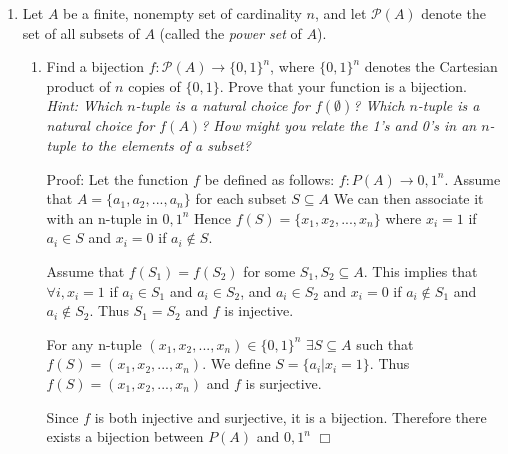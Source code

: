 \documentclass{article}
\newcommand{\bN}{\mathbb{N}}
\newcommand{\sP}{\mathscr{P}}
\begin{document}
{\begin{enumerate}[labelindent=0pt,leftmargin=0pt]
\begin{enumerate}
    Inductive Step: Assume the proposition is true for $k=n$, as in 
    $|A_1\times\cdots\times A_n|=|A_1|\cdots|A_n|$. 
    Consider the sets $A_1, A_2, ..., A_{n+1}$. We can then group the first n-sets and consider their cartesian product as a single set. We will show this set as $B = A_1, A_2, ..., A_n$ 

    By inductive hypothesis we have $|B| = |A_1|... |A_n|$

    Consider the cartesian product $B \times A_{n+1}$ which equals $A_1 \times ... \times A_{n+1}$.

    By (a) we know $|B \times A_{n+1}| = |B|*|A_{n+1}|$.
    Substuiting in $|B|$ we have $|B\times A_{n+1}| = |A_1|...|A_n|*|A_{n+1}|$
    Therefore the statement holds for all $k\in\bN$ 
    $\Box$

    \end{enumerate}
    

    \item Let $A$ be a finite, nonempty set of cardinality $n$, and let $\sP(A)$ denote the set of all subsets of $A$ (called the \textit{power set} of $A$). \begin{enumerate}\item Find a bijection $f:\sP(A)\to\{0,1\}^n$, where $\{0,1\}^n$ denotes the Cartesian product of $n$ copies of $\{0,1\}$. Prove that your function is a bijection. \textit{Hint: Which $n$-tuple is a natural choice for $f(\emptyset)$? Which $n$-tuple is a natural choice for $f(A)$? How might you relate the 1's and 0's in an $n$-tuple to the elements of a subset?}

    Proof: Let the function $f$ be defined as follows: $f:P(A)\rightarrow {0,1}^n$.
    Assume that $A = \{a_1,a_2,...,a_n\}$ for each subset $S\subseteq A$
    We can then associate it with an n-tuple in ${0,1}^n$ 
    Hence $f(S)=\{x_1,x_2,...,x_n\}$ where $x_i = 1$ if $a_i\in  S$ and $x_i = 0 $ if $a_i \notin S$.

    Assume that $f(S_1)=f(S_2)$ for some $S_1,S_2 \subseteq A$. 
    This implies that $\forall i, x_i = 1$ if $a_i \in S_1$ and $a_i \in S_2$,
    and $a_i \in S_2$ and $x_i = 0$ if $a_i \notin S_1$ and $a_i \notin S_2$.
    Thus $S_1 = S_2$ and $f$ is injective. 

    For any n-tuple $(x_1, x_2,...,x_n) \in \{0,1\}^n$ $\exists S \subseteq A$ such that $f(S) = (x_1, x_2, ..., x_n)$. We define $S = \{a_i|x_i = 1\}$. Thus $f(S) = (x_1, x_2, ..., x_n)$ and $f$ is surjective. 

    Since $f$ is both injective and surjective, it is a bijection. 
    Therefore there exists a bijection between $P(A)$ and ${0,1}^n$ 
    $\Box$


\end{enumerate}
\end{enumerate}}
\end{document}
